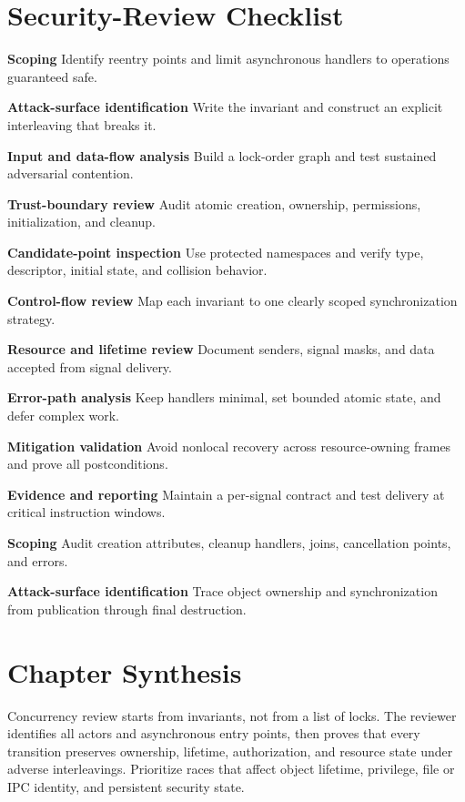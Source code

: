 \documentclass[11pt,letterpaper]{article}
\begin{document}
\section{Security-Review Checklist}
\begin{CornellChecklist}
\item \textbf{Scoping}
Identify reentry points and limit asynchronous handlers to operations guaranteed safe.
\item \textbf{Attack-surface identification}
Write the invariant and construct an explicit interleaving that breaks it.
\item \textbf{Input and data-flow analysis}
Build a lock-order graph and test sustained adversarial contention.
\item \textbf{Trust-boundary review}
Audit atomic creation, ownership, permissions, initialization, and cleanup.
\item \textbf{Candidate-point inspection}
Use protected namespaces and verify type, descriptor, initial state, and collision behavior.
\item \textbf{Control-flow review}
Map each invariant to one clearly scoped synchronization strategy.
\item \textbf{Resource and lifetime review}
Document senders, signal masks, and data accepted from signal delivery.
\item \textbf{Error-path analysis}
Keep handlers minimal, set bounded atomic state, and defer complex work.
\item \textbf{Mitigation validation}
Avoid nonlocal recovery across resource-owning frames and prove all postconditions.
\item \textbf{Evidence and reporting}
Maintain a per-signal contract and test delivery at critical instruction windows.
\item \textbf{Scoping}
Audit creation attributes, cleanup handlers, joins, cancellation points, and errors.
\item \textbf{Attack-surface identification}
Trace object ownership and synchronization from publication through final destruction.
\end{CornellChecklist}
\section{Chapter Synthesis}
Concurrency review starts from invariants, not from a list of locks. The reviewer identifies all actors and asynchronous entry points, then proves that every transition preserves ownership, lifetime, authorization, and resource state under adverse interleavings. Prioritize races that affect object lifetime, privilege, file or IPC identity, and persistent security state.
\end{document}
